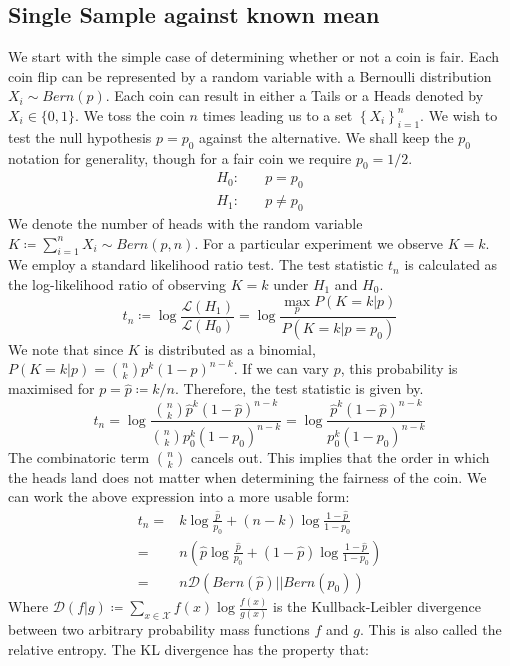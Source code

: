 \documentclass[]{article}
\newcommand{\Xcal}{\mathcal{X}}
\newcommand{\lik}{\mathcal{L}}
\newcommand{\kl}{\mathcal{D}}
\begin{document}
\subsection{Single Sample against known mean}
We start with the simple case of determining whether or not a coin is fair. Each coin flip can be represented by a random variable with a Bernoulli distribution $X_i \sim Bern(p)$. Each coin can result in either a Tails or a Heads denoted by $X_i \in \{0, 1\}$. We toss the coin $n$ times leading us to a set $\left\{ X_i \right\}_{i=1}^{n}$. We wish to test the null hypothesis $p=p_0$ against the alternative. We shall keep the $p_0$ notation for generality, though for a fair coin we require $p_0=1/2$.
%
\begin{align*}
H_0:& \quad p = p_0 \\
H_1:& \quad p \neq p_0
\end{align*}
%
We denote the number of heads with the random variable $K \coloneqq \sum_{i=1}^{n} X_i \sim Bern(p, n)$. For a particular experiment we observe $K=k$. We employ a standard likelihood ratio test. The test statistic $t_n$ is calculated as the log-likelihood ratio of observing $K=k$ under $H_1$ and $H_0$.
%
\begin{equation}
t_n \coloneqq \log \frac{\lik(H_1)}{\lik(H_0)}
= \log \frac{\max_p P(K=k|p)}{P(K=k|p=p_0)}
\end{equation} 
%
We note that since $K$ is distributed as a binomial, $P(K=k|p)=\binom{n}{k}p^k(1-p)^{n-k}$. If we can vary $p$, this probability is maximised for $p=\hat{p} \coloneqq k/n$. Therefore, the test statistic is given by.
%
\begin{equation}
t_n = \log \frac{\binom{n}{k} \hat{p}^k (1 - \hat{p})^{n-k}}{\binom{n}{k} p_0^k (1 - p_0)^{n-k}}
=  \log \frac{ \hat{p}^k (1 - \hat{p})^{n-k}}{ p_0^k (1 - p_0)^{n-k}}
\end{equation}
%
The combinatoric term $\binom{n}{k}$ cancels out. This implies that the order in which the heads land does not matter when determining the fairness of the coin. We can work the above expression into a more usable form:
%
\begin{align}
t_n =& k \log \frac{\hat{p}}{p_0} + (n-k) \log \frac{1 - \hat{p}}{1 - p_0} \nonumber \\
=& n \left( \hat{p} \log \frac{\hat{p}}{p_0} + (1-\hat{p}) \log \frac{1 - \hat{p}}{1-p_0} \right) \nonumber \\
=& n \kl \left(Bern(\hat{p}) || Bern(p_0) \right)
\end{align}
%
Where $\kl(f | g) \coloneqq \sum_{x \in \Xcal} f(x) \log \frac{f(x)}{g(x)}$ is the Kullback-Leibler divergence between two arbitrary probability mass functions $f$ and $g$. This is also called the relative entropy. The KL divergence has the property that:
\end{document}
